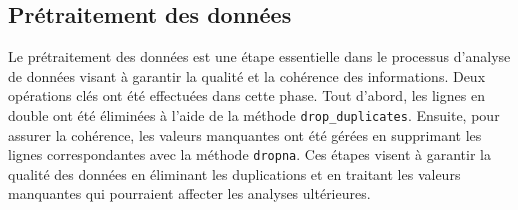 \subsection{Prétraitement des données}
Le prétraitement des données est une étape essentielle dans le processus d'analyse de données visant à garantir la qualité et la cohérence des informations. Deux opérations clés ont été effectuées dans cette phase.
Tout d'abord, les lignes en double ont été éliminées à l'aide de la méthode \texttt{drop\_duplicates}. Ensuite, pour assurer la cohérence, les valeurs manquantes ont été gérées en supprimant les lignes correspondantes avec la méthode \texttt{dropna}. Ces étapes visent à garantir la qualité des données en éliminant les duplications et en traitant les valeurs manquantes qui pourraient affecter les analyses ultérieures.


